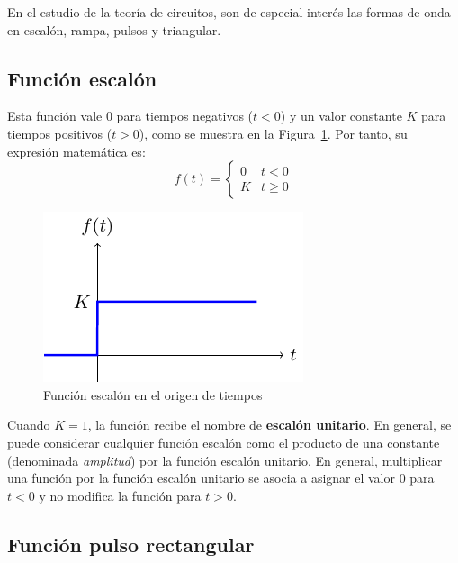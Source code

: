 \documentclass[11pt]{book} %
\begin{document}
	En el estudio de la teoría de circuitos, son de especial interés las formas de onda en escalón, rampa, pulsos y triangular.
	
	\subsection{Función escalón} 
	Esta función vale 0 para tiempos negativos ($t<0$) y un valor constante $K$ para tiempos positivos ($t>0$), como se muestra en la Figura~\ref{fig.escalon}. Por tanto, su expresión matemática es: 
	\begin{equation}
		\boxed{f(t) = %
			\begin{cases}
				0 & t < 0\\
				K & t \geq 0
		\end{cases}}
	\end{equation}
	
	\begin{figure}[htbp]
		\centering
		\includegraphics[width=.35\linewidth]{../figs/escalon.pdf}
		\caption{Función escalón en el origen de tiempos}
		\label{fig.escalon}
	\end{figure}
	
	Cuando $K = 1$, la función recibe el nombre de \textbf{escalón unitario}. En general, se puede considerar cualquier función escalón como el producto de una constante (denominada \textit{amplitud}) por la función escalón unitario.
	En general, multiplicar una función por la función escalón unitario se asocia a asignar el valor 0 para $t<0$ y no modifica la función para $t>0$.
	
	\subsection{Función pulso rectangular}
	
\end{document}
